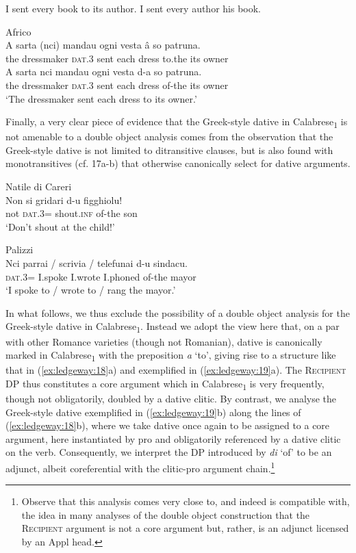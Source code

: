 \documentclass[output=paper,modfonts,nonflat,colorlinks,citecolor=brown]{langsci/langscibook}
\begin{document}
\ea\label{ex:ledgeway:15}
\ea I sent every book to its author.  
\ex I sent every author his book.
\z
\z

\ea\label{ex:ledgeway:16}
  Africo\\
\ea
	\gll A  sarta  (nci)  mandau  ogni  vesta  â  so patruna.\\
      the  dressmaker  \textsc{dat}.3  sent  each  dress  to.the  its  owner\\
\ex
	\gll A  sarta  nci  mandau  ogni  vesta  d-a  so patruna.\\
      the  dressmaker  \textsc{dat}.3  sent  each  dress  of-the  its     owner\\
      \glt `The dressmaker sent each dress to its owner.'
      \z
      \z

Finally, a very clear piece of evidence that the Greek-style dative in Calabrese\textsubscript{1} is not amenable to a double object analysis comes from the observation that the Greek-style dative is not limited to ditransitive clauses, but is also found with monotransitives (cf. 17a-b) that otherwise canonically select for dative arguments.

\ea\label{ex:ledgeway:17}
\ea Natile di Careri\\
 \gll Non  si  gridari  d-u  figghiolu!\\
    not  \textsc{dat}.3=  shout.\textsc{inf}  of-the  son\\
     \glt `Don’t shout at the child!'

\ex Palizzi  \\
    \gll Nci  parrai  /  scrivia  /  telefunai  d-u  sindacu.\\
    \textsc{dat}.3=  I.spoke    I.wrote    I.phoned  of-the  mayor\\
    \glt `I spoke to / wrote to / rang the mayor.'
    \z
    \z

In what follows, we thus exclude the possibility of a double object analysis for the Greek-style dative in Calabrese\textsubscript{1}. Instead we adopt the view here that, on a par with other Romance varieties (though not Romanian), dative is canonically marked in Calabrese\textsubscript{1} with the preposition \textit{a} ‘to’, giving rise to a structure like that in (\ref{ex:ledgeway:18}a) and exemplified in (\ref{ex:ledgeway:19}a). The \textsc{Recipient} DP thus constitutes a core argument which in Calabrese\textsubscript{1} is very frequently, though not obligatorily, doubled by a dative clitic. By contrast, we analyse the Greek-style dative exemplified in (\ref{ex:ledgeway:19}b) along the lines of (\ref{ex:ledgeway:18}b), where we take dative once again to be assigned to a core argument, here instantiated by pro and obligatorily referenced by a dative clitic on the verb. Consequently, we interpret the DP introduced by \textit{di} ‘of’ to be an adjunct, albeit coreferential with the clitic-pro argument chain.\footnote{Observe that this analysis comes very close to, and indeed is compatible with, the idea in many analyses of the double object construction that the \textsc{Recipient} argument is not a core argument but, rather, is an adjunct licensed by an Appl head.} 
\end{document}
